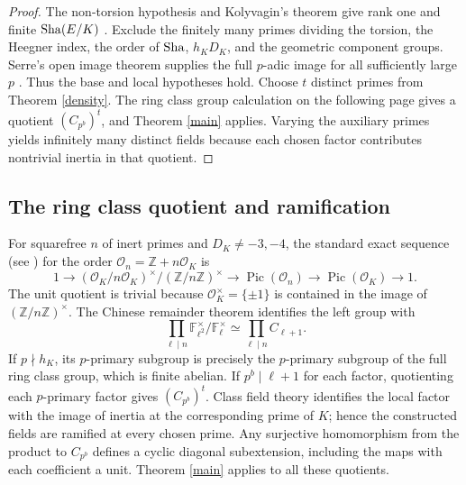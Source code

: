 \documentclass[11pt,a4paper]{article}
\numberwithin{equation}{section}
\begin{document}
\begin{proof}
The non-torsion hypothesis and Kolyvagin's theorem give rank one and finite $\operatorname{Sha}(E/K)$ \cite{Kol,Gross}. Exclude the finitely many primes dividing the torsion, the Heegner index, the order of $\operatorname{Sha}$, $h_KD_K$, and the geometric component groups. Serre's open image theorem supplies the full $p$-adic image for all sufficiently large $p$ \cite{Serre}. Thus the base and local hypotheses hold. Choose $t$ distinct primes from Theorem \ref{density}. The ring class group calculation on the following page gives a quotient $(C_{p^b})^t$, and Theorem \ref{main} applies. Varying the auxiliary primes yields infinitely many distinct fields because each chosen factor contributes nontrivial inertia in that quotient.
\end{proof}
\subsection{The ring class quotient and ramification}
For squarefree $n$ of inert primes and $D_K\ne-3,-4$, the standard exact sequence (see \cite{Cox}) for the order $\mathcal O_n=\mathbb Z+n\mathcal O_K$ is
\begin{equation}\label{classseq}
1\to (\mathcal O_K/n\mathcal O_K)^\times/(\mathbb Z/n\mathbb Z)^\times
\to\operatorname{Pic}(\mathcal O_n)\to\operatorname{Pic}(\mathcal O_K)\to1.
\end{equation}
The unit quotient is trivial because $\mathcal O_K^\times=\{\pm1\}$ is contained in the image of $(\mathbb Z/n\mathbb Z)^\times$. The Chinese remainder theorem identifies the left group with
\[ \prod_{\ell\mid n}\mathbb F_{\ell^2}^\times/\mathbb F_\ell^\times\simeq\prod_{\ell\mid n}C_{\ell+1}. \]
If $p\nmid h_K$, its $p$-primary subgroup is precisely the $p$-primary subgroup of the full ring class group, which is finite abelian. If $p^b\mid\ell+1$ for each factor, quotienting each $p$-primary factor gives $(C_{p^b})^t$. Class field theory identifies the local factor with the image of inertia at the corresponding prime of $K$; hence the constructed fields are ramified at every chosen prime. Any surjective homomorphism from the product to $C_{p^b}$ defines a cyclic diagonal subextension, including the maps with each coefficient a unit. Theorem \ref{main} applies to all these quotients.
\end{document}
